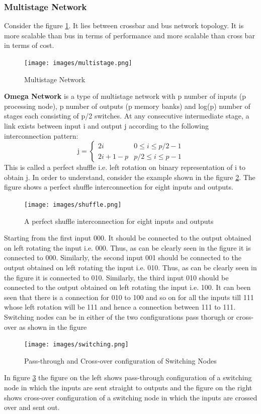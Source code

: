 \documentclass[12pt]{book}
\begin{document}
\subsubsection{Multistage Network}
Consider the figure \ref{fig:multistage}. It lies between crossbar and bus network topology.
It is more scalable than bus in terms of performance and more scalable than cross bar in terms of cost.
\begin{figure}[H]
    \centering
    \texttt{[image: images/multistage.png]}
    \caption{Multistage Network}
    \label{fig:multistage}
\end{figure}
\textbf{Omega Network} is a type of multistage network with p number of inputs (p processing node), 
p number of outputs (p memory banks) and log(p) number of stages each consisting of p/2 switches. At any consecutive intermediate stage, 
a link exists between input i and output j according to the following interconnection pattern:
\begin{equation}
    \text{j} = 
    \begin{cases}
        2i & 0\leq i\leq p/2-1 \\
        2i+1-p & p/2\leq i\leq p-1
    \end{cases}
\end{equation}
This is called a perfect shuffle i.e. left rotation on binary representation of i to obtain j.
In order to understand, consider the example shown in the figure \ref{fig:shuffle}. The figure shows a perfect shuffle interconnection for eight inputs and outputs.
\begin{figure}[H]
    \centering
    \texttt{[image: images/shuffle.png]}
    \caption{A perfect shuffle interconnection for eight inputs and outputs}
    \label{fig:shuffle}
\end{figure}
Starting from the first input 000. It should be connected to the output obtained on left rotating the input i.e. 000. 
Thus, as can be clearly seen in the figure it is connected to 000. Similarly, the second input 001 should be connected to the output obtained on left rotating the input i.e. 010.
Thus, as can be clearly seen in the figure it is connected to 010. Similarly, the third input 010 should be connected to the output obtained on left rotating the input i.e. 100. 
It can been seen that there is a connection for 010 to 100 and so on for all the inputs till 111 whose left rotation will be 111 and hence a connection between 111 to 111.
Switching nodes can be in either of the two configurations pass thorugh or cross-over as shown in the figure 
\begin{figure}[H]
    \centering
    \texttt{[image: images/switching.png]}
    \caption{Pass-through and Cross-over configuration of Switching Nodes}
    \label{fig:switching}
\end{figure}
In figure \ref{fig:switching} the figure on the left shows pass-through configuration of a switching node in which the inputs are sent straight to outputs
and the figure on the right shows cross-over configuration of a switching node in which the inputs are crossed over and sent out.
\end{document}

